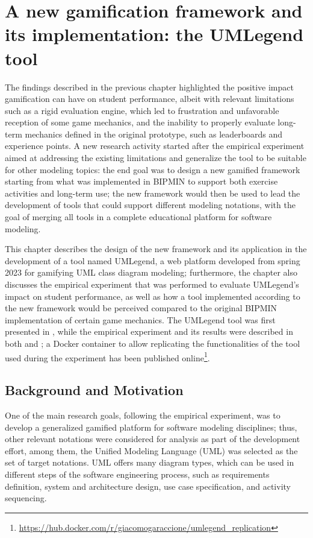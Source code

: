 \chapter{A new gamification framework and its implementation: the UMLegend tool}
\label{ch4}

\graphicspath{{Chapter4/}}

The findings described in the previous chapter highlighted the positive impact gamification can have on student performance, albeit with relevant limitations such as a rigid evaluation engine, which led to frustration and unfavorable reception of some game mechanics, and the inability to properly evaluate long-term mechanics defined in the original prototype, such as leaderboards and experience points. A new research activity started after the empirical experiment aimed at addressing the existing limitations and generalize the tool to be suitable for other modeling topics: the end goal was to design a new gamified framework starting from what was implemented in BIPMIN to support both exercise activities and long-term use; the new framework would then be used to lead the development of tools that could support different modeling notations, with the goal of merging all tools in a complete educational platform for software modeling.

This chapter describes the design of the new framework and its application in the development of a tool named UMLegend, a web platform developed from spring 2023 for gamifying UML class diagram modeling; furthermore, the chapter also discusses the empirical experiment that was performed to evaluate UMLegend's impact on student performance, as well as how a tool implemented according to the new framework would be perceived compared to the original BIPMIN implementation of certain game mechanics. The UMLegend tool was first presented in \cite{cagnazzo_2023_umlegend}, while the empirical experiment and its results were described in both \cite{garaccione_2024_sqj} and \cite{garaccione_2026_gamification}; a Docker container to allow replicating the functionalities of the tool used during the experiment has been published online\footnote{\url{https://hub.docker.com/r/giacomogaraccione/umlegend_replication}}.


\section{Background and Motivation}
\label{sec:back4}

One of the main research goals, following the empirical experiment, was to develop a generalized gamified platform for software modeling disciplines; thus, other relevant notations were considered for analysis as part of the development effort, among them, the Unified Modeling Language (UML) was selected as the set of target notations. UML offers many diagram types, which can be used in different steps of the software engineering process, such as requirements definition, system and architecture design, use case specification, and activity sequencing.

